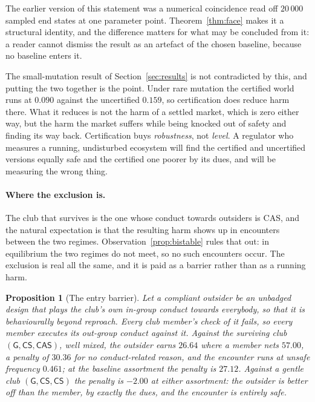 \documentclass[11pt,a4paper]{article}
\newtheorem{proposition}[theorem]{Proposition}
\theoremstyle{definition}
\newcommand{\CS}{\textsf{CS}}
\newcommand{\CAS}{\textsf{CAS}}
\begin{document}
The earlier version of this statement was a numerical coincidence read off
$20\,000$ sampled end states at one parameter point. Theorem~\ref{thm:face}
makes it a structural identity, and the difference matters for what may be
concluded from it: a reader cannot dismiss the result as an artefact of the
chosen baseline, because no baseline enters it.

The small-mutation result of Section~\ref{sec:results} is not contradicted by
this, and putting the two together is the point. Under rare mutation the
certified world runs at $0.090$ against the uncertified $0.159$, so
certification does reduce harm there. What it reduces is not the harm of a
settled market, which is zero either way, but the harm the market suffers while
being knocked out of safety and finding its way back. Certification buys
\emph{robustness}, not \emph{level}. A regulator who measures a running,
undisturbed ecosystem will find the certified and uncertified versions equally
safe and the certified one poorer by its dues, and will be measuring the wrong
thing.

\paragraph{Where the exclusion is.}
The club that survives is the one whose conduct towards outsiders is \CAS{},
and the natural expectation is that the resulting harm shows up in encounters
between the two regimes. Observation~\ref{prop:bistable} rules that out: in
equilibrium the two regimes do not meet, so no such encounters occur. The
exclusion is real all the same, and it is paid as a barrier rather than as a
running harm.

\begin{proposition}[The entry barrier]
\label{prop:exclusion}
Let a compliant outsider be an unbadged design that plays the club's own
in-group conduct towards everybody, so that it is behaviourally beyond
reproach. Every club member's check of it fails, so every member executes its
out-group conduct against it. Against the surviving club
$(\mathsf{G}, \CS, \CAS)$, well mixed, the outsider earns $26.64$ where a member
nets $57.00$, a penalty of $30.36$ for no conduct-related reason, and the
encounter runs at unsafe frequency $0.461$; at the baseline assortment the
penalty is $27.12$. Against a gentle club
$(\mathsf{G}, \CS, \CS)$ the penalty is $-2.00$ at either assortment: the
outsider is \emph{better off} than the member, by exactly the dues, and the
encounter is entirely safe.
\end{proposition}
\end{document}
